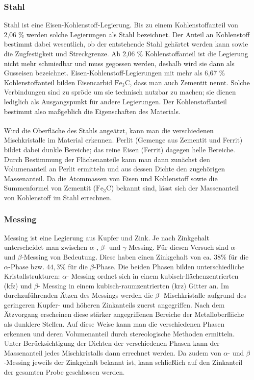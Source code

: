 \documentclass[german,  %
parskip=full,  %
]{scrartcl}
\begin{document}
\subsubsection{Stahl}
Stahl ist eine Eisen-Kohlenstoff-Legierung. Bis zu einem Kohlenstoffanteil von 2,06 \% werden solche Legierungen als Stahl bezeichnet. Der Anteil an Kohlenstoff bestimmt dabei wesentlich, ob der entstehende Stahl gehärtet werden kann sowie die Zugfestigkeit und Streckgrenze. Ab 2,06 \% Kohlenstoffanteil ist die Legierung nicht mehr schmiedbar und muss gegossen werden, deshalb wird sie dann als Gusseisen bezeichnet. Eisen-Kohlenstoff-Legierungen mit mehr als 6,67 \% Kohlenstoffanteil bilden Eisencarbid \(\mathrm{Fe}_3\mathrm{C}\), dass man auch Zementit nennt. Solche Verbindungen sind zu spröde um sie technisch nutzbar zu machen; sie dienen lediglich als Ausgangspunkt für andere Legierungen. Der Kohlenstoffanteil bestimmt also maßgeblich die Eigenschaften des Materials. \\\\
Wird die Oberfläche des Stahls angeätzt, kann man die verschiedenen Mischkristalle im Material erkennen. Perlit (Gemenge aus Zementit und Ferrit) bildet dabei dunkle Bereiche; das reine Eisen (Ferrit) dagegen helle Bereiche. Durch Bestimmung der Flächenanteile kann man dann zunächst den Volumenanteil an Perlit ermitteln und aus dessen Dichte den zugehörigen Massenanteil. Da die Atommassen von Eisen und Kohlenstoff sowie die Summenformel von Zementit (\(\mathrm{Fe}_3\mathrm{C}\)) bekannt sind, lässt sich der Massenanteil von Kohlenstoff im Stahl errechnen.



\subsubsection{Messing}
Messing ist eine Legierung aus Kupfer und Zink. Je nach Zinkgehalt unterscheidet man zwischen $\alpha$-, $\beta$- und $\gamma$-Messing. Für diesen Versuch sind  $\alpha$- und $\beta$-Messing von Bedeutung. Diese haben einen Zinkgehalt von ca. $38$\% für die \(\alpha\)-Phase bzw. $44,3$\% für die \(\beta\)-Phase. Die beiden Phasen bilden unterschiedliche Kristallstrukturen: $\alpha$- Messing ordnet sich in einem kubisch-flächenzentrierten (kfz) und $\beta$- Messing in einem kubisch-raumzentrierten (krz) Gitter an. Im durchzuführenden Ätzen des Messings werden die $\beta$- Mischkristalle aufgrund des geringeren Kupfer- und höheren Zinkanteils zuerst angegriffen. Nach dem Ätzvorgang erscheinen diese stärker angegriffenen Bereiche der Metalloberfläche als dunklere Stellen. Auf diese Weise kann man die verschiedenen Phasen erkennen und deren Volumenanteil durch stereologische Methoden ermitteln. Unter Berücksichtigung der Dichten der verschiedenen Phasen kann der Massenanteil jedes Mischkristalls dann errechnet werden. Da zudem von \(\alpha\)- und \(\beta\)-Messing jeweils der Zinkgehalt bekannt ist, kann schließlich auf den Zinkanteil der gesamten Probe geschlossen werden.
\end{document}
